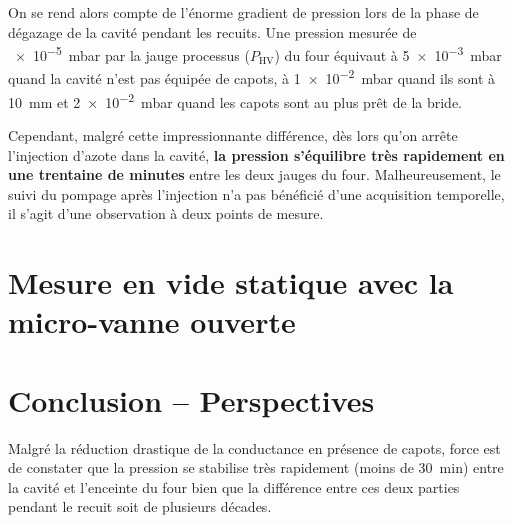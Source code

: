 On se rend alors compte de l'énorme gradient de pression lors de la phase de dégazage de la cavité pendant les recuits. Une pression mesurée de \SI{e-5}{\milli\bar} par la jauge processus ($P_\text{HV}$) du four équivaut à \SI{5e-3}{\milli\bar} quand la cavité n'est pas équipée de capots, à \SI{1e-2}{\milli\bar} quand ils sont à \SI{10}{\milli\meter} et \SI{2e-2}{\milli\bar} quand les capots sont au plus prêt de la bride.

Cependant, malgré cette impressionnante différence, dès lors qu'on arrête l'injection d'azote dans la cavité, \textbf{la pression s'équilibre très rapidement en une trentaine de minutes} entre les deux jauges du four. Malheureusement, le suivi du pompage après l'injection n'a pas bénéficié d'une acquisition temporelle, il s'agit d'une observation à deux points de mesure.

\chapter{Mesure en vide statique avec la micro-vanne ouverte}

\chapter{Conclusion -- Perspectives}
Malgré la réduction drastique de la conductance en présence de capots, force est de constater que la pression se stabilise très rapidement (moins de \SI{30}{\minute}) entre la cavité et l'enceinte du four bien que la différence entre ces deux parties pendant le recuit soit de plusieurs décades.

